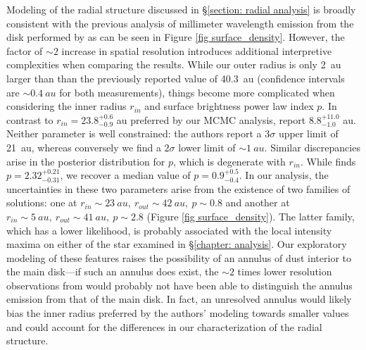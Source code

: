 \documentclass[12pt,oneside]{book}
\begin{document}
Modeling of the radial structure discussed in \S \ref{section: radial analysis} is broadly consistent with the previous analysis of millimeter wavelength emission from the disk performed by \cite{macgregor13} as can be seen in Figure \ref{fig surface_density}. 
However, the factor of $\sim 2$ increase in spatial resolution introduces additional interpretive complexities when comparing the results.
While our outer radius is only \SI{2}{au} larger than than the previously reported value of \SI{40.3}{au} (confidence intervals are $\sim \SI{0.4}{au}$ for both measurements), things become more complicated when considering the inner radius $r_{in}$ and surface brightness power law index $p$.
In contrast to $r_{in} = 23.8_{-0.9}^{ +0.6}$ \si{au} preferred by our MCMC analysis, \cite{macgregor13} report $8.8_{-1.0} ^{+11.0}$ \si{au}.
Neither parameter is well constrained: the authors report a $3 \sigma$ upper limit of \SI{21}{au}, whereas conversely we find a $2 \sigma$ lower limit of $\sim \SI{1}{au}$.
Similar discrepancies arise in the posterior distribution for $p$, which is degenerate with $r_{in}$.
While \cite{macgregor13} finds $p=2.32_{-0.31}^{+0.21}$, we recover a median value of $p=0.9_{-0.4}^{+0.5}$.
In our analysis, the uncertainties in these two parameters arise from the existence of two families of solutions: one at $r_{in} \sim \SI{23}{au},\ r_{out} \sim \SI{42}{au},\ p \sim 0.8$ and another at $r_{in} \sim \SI{5}{au},\ r_{out} \sim \SI{41}{au},\ p \sim 2.8$ (Figure \ref{fig surface_density}).
The latter family, which has a lower likelihood, is probably associated with the local intensity maxima on either of the star examined in \S \ref{chapter: analysis}.
Our exploratory modeling of these features raises the possibility of an annulus of dust interior to the main disk---if such an annulus does exist, the $\sim 2$ times lower resolution observations from \cite{macgregor13} would probably not have been able to distinguish the annulus emission from that of the main disk.
In fact, an unresolved annulus would likely bias the inner radius preferred by the authors' modeling towards smaller values and could account for the differences in our characterization of the radial structure.
\end{document}
